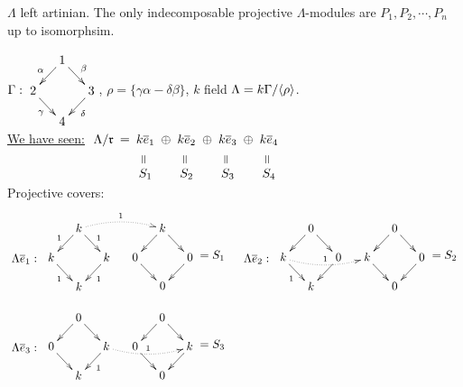 \begin{cor}
$\Lambda$ left artinian. The only indecomposable projective $\Lambda$-modules are $P_1, P_2, \cdots, P_n$ up to isomorphsim.

\begin{exam}
$\G : 
\vcenter{\xymatrix@C-1pc@R-1pc{
&1 \ar[dl]_\alpha \ar[dr]^\beta &\\
2 \ar[dr]_\gamma &&3 \ar[dl]^\delta\\
&4&
}}$, $\rho = \{ \gamma\alpha-\delta\beta \}$, $k$ field $\Lambda = k\Gamma / \langle \rho \rangle$.\\
\underline{We have seen:} $\xymatrix@C-1pc@R-1pc{
\Lambda/\mathfrak{r} \ar@{}[r]|-*[@]{=} & k\overline{e}_1 \ar@{}[r]|-*[@]{\oplus}\ar@{}[d]|-*[@]{=} & k\overline{e}_2 \ar@{}[r]|-*[@]{\oplus}\ar@{}[d]|-*[@]{=} & k\overline{e}_3 \ar@{}[r]|-*[@]{\oplus}\ar@{}[d]|-*[@]{=} & k\overline{e}_4 \ar@{}[d]|-*[@]{=}\\
                     & S_1              & S_2              & S_3              & S_4
}$\\
Projective covers:
\[
\begin{matrix}
\xy
\POS(25, 0)
\xymatrix"S1"@C-1pc@R-1pc{
&k \ar[dl] \ar[dr]&\\
0\ar[dr] && 0 \ar[dl]\\
&0&
}
\POS+(23, -8)
\xymatrix{
= S_1}
\POS(0,0)
\xymatrix"e1"{
&k \ar[dl]_1 \ar[dr]^1 \ar@{.>}@/^/["S1"]^1&\\
k \ar[dr]_1 && k \ar[dl]^1\\
&k&
}
\POS(-8, -9)
\xymatrix{
\Lambda \overline{e}_1:}
\endxy

&

\xy
\POS(25, 0)
\xymatrix"S1"@C-1pc@R-1pc{
&0 \ar[dl] \ar[dr]&\\
k\ar[dr] && 0 \ar[dl]\\
&0&
}
\POS+(23, -8)
\xymatrix{
= S_2}
\POS(0,0)
\xymatrix"e1"{
&0 \ar[dl] \ar[dr] &\\
k \ar[dr]_1 \ar@{.>}@/_/["S1"]^1 && 0 \ar[dl]\\
&k&
}
\POS(-8, -9)
\xymatrix{
\Lambda \overline{e}_2:}
\endxy

\\
\\

\xy
\POS(25, 0)
\xymatrix"S1"@C-1pc@R-1pc{
&0 \ar[dl] \ar[dr]&\\
0\ar[dr] && k \ar[dl]\\
&0&
}
\POS+(23, -8)
\xymatrix{
= S_3}
\POS(0,0)
\xymatrix"e1"{
&0 \ar[dl] \ar[dr] &\\
0 \ar[dr]  && k \ar[dl]^1 \ar@{.>}@/_/["S1"]^1\\
&k&
}
\POS(-8, -9)
\xymatrix{
\Lambda \overline{e}_3:}
\endxy


\end{matrix}\]
\end{exam}
\end{cor}

